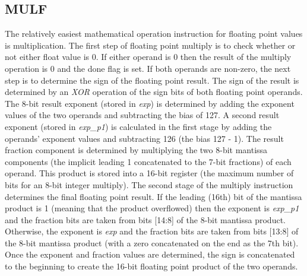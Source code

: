 \documentclass[conference]{IEEEtran}
\begin{document}
    \subsection{MULF}
    The relatively easiest mathematical operation instruction for floating point values is multiplication. The first step of floating point multiply is to check whether or not either float value is 0. If either operand is 0 then the result of the multiply operation is 0 and the done flag is set. If both operands are non-zero, the next step is to determine the sign of the floating point result. The sign of the result is determined by an \textit{XOR} operation of the sign bits of both floating point operands. The 8-bit result exponent (stored in \textit{exp}) is determined by adding the exponent values of the two operands and subtracting the bias of 127. A second result exponent (stored in \textit{exp\_p1}) is calculated in the first stage by adding the operands' exponent values and subtracting 126 (the bias 127 - 1). The result fraction component is determined by multiplying the two 8-bit mantissa components (the implicit leading 1 concatenated to the 7-bit fractions) of each operand. This product is stored into a 16-bit register (the maximum number of bits for an 8-bit integer multiply). The second stage of the multiply instruction determines the final floating point result. If the leading (16th) bit of the mantissa product is 1 (meaning that the product overflowed) then the exponent is \textit{exp\_p1} and the fraction bits are taken from bits [14:8] of the 8-bit mantissa product. Otherwise, the exponent is \textit{exp} and the fraction bits are taken from bits [13:8] of the 8-bit mantissa product (with a zero concatenated on the end as the 7th bit). Once the exponent and fraction values are determined, the sign is concatenated to the beginning to create the 16-bit floating point product of the two operands.
    
\end{document}
